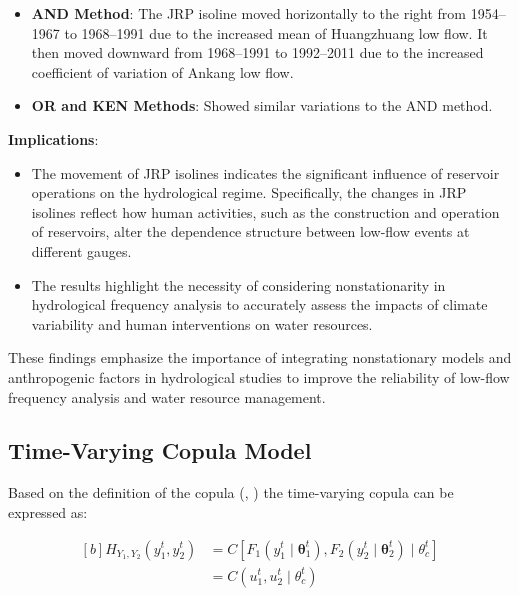 \documentclass[
]{krantz}
\providecommand{\tightlist}{%
  \setlength{\itemsep}{0pt}\setlength{\parskip}{0pt}}
\begin{document}
\begin{itemize}
\tightlist
\item
  \textbf{AND Method}: The JRP isoline moved horizontally to the right from 1954--1967 to 1968--1991 due to the increased mean of Huangzhuang low flow. It then moved downward from 1968--1991 to 1992--2011 due to the increased coefficient of variation of Ankang low flow.
\item
  \textbf{OR and KEN Methods}: Showed similar variations to the AND method.
\end{itemize}

\textbf{Implications}:

\begin{itemize}
\tightlist
\item
  The movement of JRP isolines indicates the significant influence of reservoir operations on the hydrological regime. Specifically, the changes in JRP isolines reflect how human activities, such as the construction and operation of reservoirs, alter the dependence structure between low-flow events at different gauges.
\item
  The results highlight the necessity of considering nonstationarity in hydrological frequency analysis to accurately assess the impacts of climate variability and human interventions on water resources.
\end{itemize}

These findings emphasize the importance of integrating nonstationary models and anthropogenic factors in hydrological studies to improve the reliability of low-flow frequency analysis and water resource management.

\subsection{Time-Varying Copula Model}\label{time-varying-copula-model}

Based on the definition of the copula (\citet{nelsen2006}, \citet{Salvadori2007}) the time-varying copula can be expressed as:

\[
\begin{aligned}[b]
H_{Y_{1}, Y_{2}}\left(y_{1}^{t}, y_{2}^{t}\right) & =C\left[F_{1}\left(y_{1}^{t} \mid \boldsymbol{\theta}_{1}^{t}\right), F_{2}\left(y_{2}^{t} \mid \boldsymbol{\theta}_{2}^{t}\right) \mid \theta_{c}^{t}\right]  \\
& =C\left(u_{1}^{t}, u_{2}^{t} \mid \theta_{c}^{t}\right)
\end{aligned}\tag{26}
\]
\end{document}
